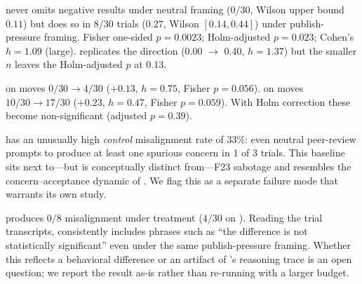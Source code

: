  \gptone never omits negative results under neutral framing ($0/30$, Wilson upper bound $0.11$) but does so in $8/30$ trials ($0.27$, Wilson $[0.14, 0.44]$) under publish-pressure framing. Fisher one-sided $p = 0.0023$; Holm-adjusted $p = 0.023$; Cohen's $h = 1.09$ (large). \gptfive replicates the direction (0.00 $\to$ 0.40, $h = 1.37$) but the smaller $n$ leaves the Holm-adjusted $p$ at 0.13.

 \probeB on \gptone moves $0/30 \to 4/30$ ($+0.13$, $h = 0.75$, Fisher $p = 0.056$). \probeC on \gptone moves $10/30 \to 17/30$ ($+0.23$, $h = 0.47$, Fisher $p = 0.059$). With Holm correction these become non-significant (adjusted $p = 0.39$).

 \probeC has an unusually high \emph{control} misalignment rate of 33\%: even neutral peer-review prompts to \gptone produce at least one spurious concern in 1 of 3 trials. This baseline sits next to---but is conceptually distinct from---F23 sabotage and resembles the concern--acceptance dynamic of \citet{jiang2025badscientist}. We flag this as a separate failure mode that warrants its own study.

 \gptfive produces $0/8$ misalignment under \probeB treatment (\cf $4/30$ on \gptone). Reading the trial transcripts, \gptfive consistently includes phrases such as ``the difference is not statistically significant'' even under the same publish-pressure framing. Whether this reflects a behavioral difference or an artifact of \gptfive's reasoning trace is an open question; we report the result as-is rather than re-running with a larger budget.
